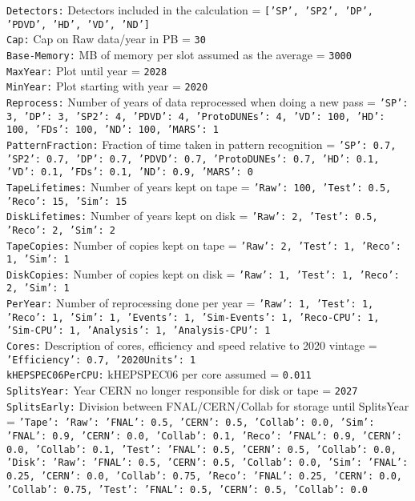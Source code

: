 
{\tt Detectors:} Detectors included in the calculation = {\tt ['SP', 'SP2', 'DP', 'PDVD', 'HD', 'VD', 'ND']} \\
{\tt Cap:} Cap on Raw data/year in PB = {\tt 30} \\
{\tt Base-Memory:} MB of memory per slot assumed as the average = {\tt 3000} \\
{\tt MaxYear:} Plot until year = {\tt 2028} \\
{\tt MinYear:} Plot starting with year = {\tt 2020} \\
{\tt Reprocess:} Number of years of data reprocessed when doing a new pass = {\tt {'SP': 3, 'DP': 3, 'SP2': 4, 'PDVD': 4, 'ProtoDUNEs': 4, 'VD': 100, 'HD': 100, 'FDs': 100, 'ND': 100, 'MARS': 1}} \\
{\tt PatternFraction:} Fraction of time taken in pattern recognition = {\tt {'SP': 0.7, 'SP2': 0.7, 'DP': 0.7, 'PDVD': 0.7, 'ProtoDUNEs': 0.7, 'HD': 0.1, 'VD': 0.1, 'FDs': 0.1, 'ND': 0.9, 'MARS': 0}} \\
{\tt TapeLifetimes:} Number of years kept on tape = {\tt {'Raw': 100, 'Test': 0.5, 'Reco': 15, 'Sim': 15}} \\
{\tt DiskLifetimes:} Number of years kept on disk = {\tt {'Raw': 2, 'Test': 0.5, 'Reco': 2, 'Sim': 2}} \\
{\tt TapeCopies:} Number of copies kept on tape = {\tt {'Raw': 2, 'Test': 1, 'Reco': 1, 'Sim': 1}} \\
{\tt DiskCopies:} Number of copies kept on disk = {\tt {'Raw': 1, 'Test': 1, 'Reco': 2, 'Sim': 1}} \\
{\tt PerYear:} Number of reprocessing done per year = {\tt {'Raw': 1, 'Test': 1, 'Reco': 1, 'Sim': 1, 'Events': 1, 'Sim-Events': 1, 'Reco-CPU': 1, 'Sim-CPU': 1, 'Analysis': 1, 'Analysis-CPU': 1}} \\
{\tt Cores:} Description of cores, efficiency and speed relative to 2020 vintage = {\tt {'Efficiency': 0.7, '2020Units': 1}} \\
{\tt kHEPSPEC06PerCPU:} kHEPSPEC06 per core assumed = {\tt 0.011} \\
{\tt SplitsYear:} Year CERN no longer responsible for disk or tape = {\tt 2027} \\
{\tt SplitsEarly:} Division between FNAL/CERN/Collab for storage until SplitsYear = {\tt {'Tape': {'Raw': {'FNAL': 0.5, 'CERN': 0.5, 'Collab': 0.0}, 'Sim': {'FNAL': 0.9, 'CERN': 0.0, 'Collab': 0.1}, 'Reco': {'FNAL': 0.9, 'CERN': 0.0, 'Collab': 0.1}, 'Test': {'FNAL': 0.5, 'CERN': 0.5, 'Collab': 0.0}}, 'Disk': {'Raw': {'FNAL': 0.5, 'CERN': 0.5, 'Collab': 0.0}, 'Sim': {'FNAL': 0.25, 'CERN': 0.0, 'Collab': 0.75}, 'Reco': {'FNAL': 0.25, 'CERN': 0.0, 'Collab': 0.75}, 'Test': {'FNAL': 0.5, 'CERN': 0.5, 'Collab': 0.0}}}} \\
